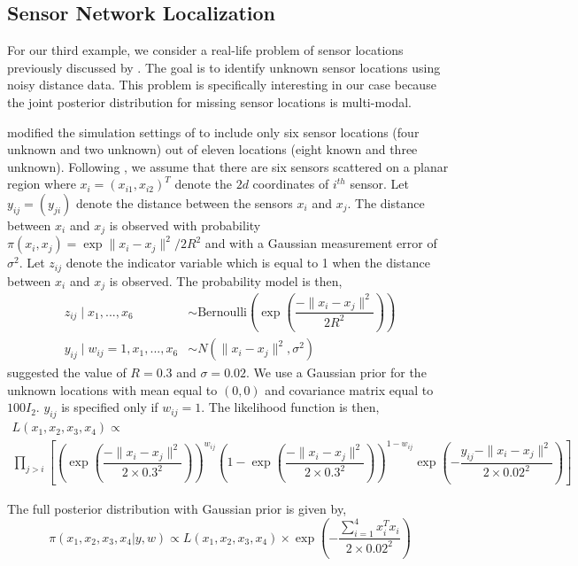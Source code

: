\documentclass[11pt]{article}
\theoremstyle{remark}
\begin{document}
\subsection{Sensor Network Localization}

For our third example, we consider a real-life problem of sensor locations previously discussed by \cite{ihler2005nonparametric}. The goal is to identify unknown sensor locations using noisy distance data. This problem is specifically interesting in our case because the joint posterior distribution for missing sensor locations is multi-modal. 

\cite{tak2018repelling} modified the simulation settings of \cite{lan2014wormhole} to include only six sensor locations (four unknown and two unknown) out of eleven locations (eight known and three unknown). Following \cite{tak2018repelling}, we assume that there are six sensors scattered on a planar region where $x_i = (x_{i1}, x_{i2})^T$ denote the $2d$ coordinates of $i^{th}$ sensor. Let $y_{ij} = (y_{ji})$ denote the distance between the sensors $x_i$ and $x_j$. The distance between $x_i$ and $x_j$ is observed with probability $\pi (x_i, x_j) = \exp{\|x_i - x_j\|^2 / 2R^2}$ and with a Gaussian measurement error of $\sigma^2$. Let $z_{ij}$ denote the indicator variable which is equal to 1 when the distance between $x_i$ and $x_j$ is observed. The probability model is then,
%
\begin{align*}
    z_{ij} \mid x_1, ..., x_6 & \sim \text{Bernoulli}\left(\exp\left(\dfrac{-\|x_i - x_j\|^2}{2R^2}\right)\right)\\
    y_{ij} \mid w_{ij} = 1, x_1, ..., x_6 &\sim N(\|x_i - x_j\|^2, \sigma^2)
\end{align*}
%
\cite{ahn2013distributed} suggested the value of $R = 0.3$ and $\sigma = 0.02$. We use a Gaussian prior for the unknown locations with  mean equal to $(0,0)$ and covariance matrix equal to $100 I_2$. $y_{ij}$ is specified only if $w_{ij} = 1$. The likelihood function is then,
%
\begin{multline*}
    L(x_1, x_2, x_3, x_4) \propto \\
\prod_{j>i} \left[ \left(\exp\left(\dfrac{-\|x_i - x_j\|^2}{2 \times 0.3^2}\right)\right)^{w_{ij}} \left(1 - \exp\left(\dfrac{-\|x_i - x_j\|^2}{2 \times 0.3^2}\right)\right)^{1 - w_{ij}} \exp \left(-\dfrac{y_{ij} - \|x_i - x_j\|^2}{2 \times 0.02^2}\right)\right]    
\end{multline*}

The full posterior distribution with Gaussian prior is given by,
\begin{equation} \label{ex:sensor_post}
    \pi (x_1, x_2, x_3, x_4 | y, w) \propto 
    L(x_1, x_2, x_3, x_4) \times \exp \left(- \dfrac{\sum_{i = 1}^{4} x_i^Tx_i}{2 \times 0.02^2}\right) 
\end{equation}
\end{document}
